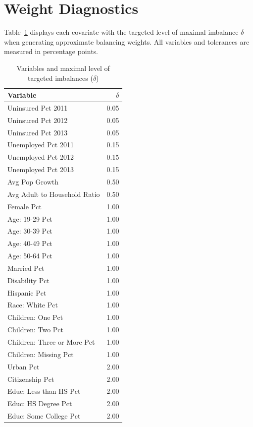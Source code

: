 \section{Weight Diagnostics}\label{app:weightdiagnostics}

Table~\ref{tab:toltable} displays each covariate with the targeted level of maximal imbalance $\delta$ when generating approximate balancing weights. All variables and tolerances are measured in percentage points.

\begin{table}[ht]
\centering
\caption{Variables and maximal level of targeted imbalances ($\delta$)}
\begin{tabular}{lr}\label{tab:toltable}
Variable & $\delta$ \\ 
  \hline
Uninsured Pct 2011 & 0.05 \\ 
  Uninsured Pct 2012 & 0.05 \\ 
  Uninsured Pct 2013 & 0.05 \\ 
  Unemployed Pct 2011 & 0.15 \\ 
  Unemployed Pct 2012 & 0.15 \\ 
  Unemployed Pct 2013 & 0.15 \\ 
  Avg Pop Growth & 0.50 \\ 
  Avg Adult to Household Ratio & 0.50 \\ 
  Female Pct & 1.00 \\ 
  Age: 19-29 Pct & 1.00 \\ 
  Age: 30-39 Pct & 1.00 \\ 
  Age: 40-49 Pct & 1.00 \\ 
  Age: 50-64 Pct & 1.00 \\ 
  Married Pct & 1.00 \\ 
  Disability Pct & 1.00 \\ 
  Hispanic Pct & 1.00 \\ 
  Race: White Pct & 1.00 \\ 
  Children: One Pct & 1.00 \\ 
  Children: Two Pct & 1.00 \\ 
  Children: Three or More Pct & 1.00 \\ 
  Children: Missing Pct & 1.00 \\ 
  Urban Pct & 2.00 \\ 
  Citizenship Pct & 2.00 \\ 
  Educ: Less than HS Pct & 2.00 \\ 
  Educ: HS Degree Pct & 2.00 \\ 
  Educ: Some College Pct & 2.00 \\ 

\end{tabular}
\end{table}
